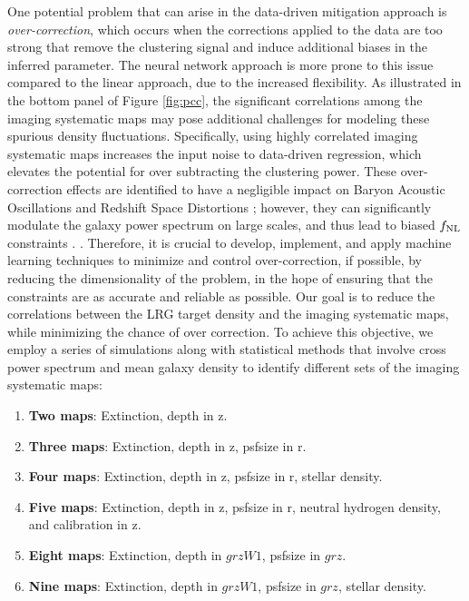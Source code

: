 One potential problem that can arise in the data-driven mitigation approach is \textit{over-correction}, which occurs when the corrections applied to the data are too strong that remove the clustering signal and induce additional biases in the inferred parameter. The neural network approach is more prone to this issue compared to the linear approach, due to the increased flexibility. As illustrated in the bottom panel of Figure \ref{fig:pcc}, the significant correlations among the imaging systematic maps may pose additional challenges for modeling these spurious density fluctuations. Specifically, using highly correlated imaging systematic maps increases the input noise to data-driven regression, which elevates the potential for over subtracting the clustering power. These over-correction effects are identified to have a negligible impact on Baryon Acoustic Oscillations and Redshift Space Distortions \citep{merz2021clustering}; however, they can significantly modulate the galaxy power spectrum on large scales, and thus lead to biased $f_{\rm NL}$ constraints \citep{rezaie2021primordial, mueller2022primordial}. . Therefore, it is crucial to develop, implement, and apply machine learning techniques to minimize and control over-correction, if possible, by reducing the dimensionality of the problem, in the hope of ensuring that the constraints are as accurate and reliable as possible. Our goal is to reduce the correlations between the LRG target density and the imaging systematic maps, while minimizing the chance of over correction.  To achieve this objective, we employ a series of simulations along with statistical methods that involve cross power spectrum and mean galaxy density to identify different sets of the imaging systematic maps: 
\begin{enumerate}[itemindent=*]
\item \textbf{Two maps}: Extinction, depth in z.
\item \textbf{Three maps}: Extinction, depth in z, psfsize in r.
\item \textbf{Four maps}: Extinction, depth in z, psfsize in r, stellar density.
\item \textbf{Five maps}: Extinction, depth in z, psfsize in r, neutral hydrogen density, and calibration in z.
\item \textbf{Eight maps}: Extinction, depth in $grzW1$, psfsize in $grz$.
\item \textbf{Nine maps}: Extinction, depth in $grzW1$, psfsize in $grz$, stellar density.
\end{enumerate}
 
